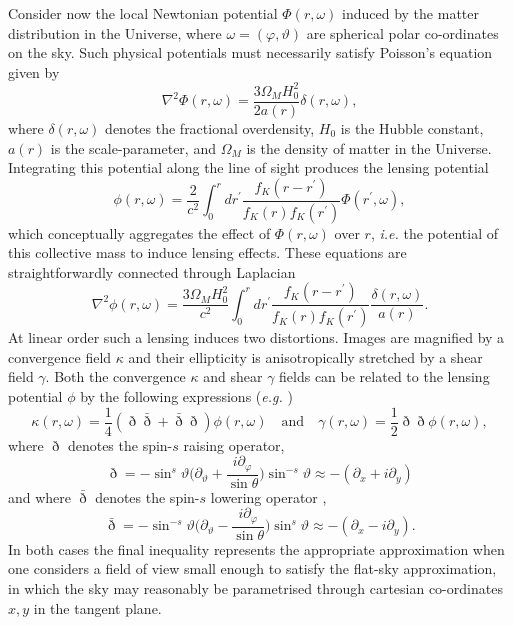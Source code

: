 \documentclass[fleqn,usenatbib]{mnras}
\begin{document}
Consider now the local Newtonian potential $\Phi(r, \omega)$ induced by the matter distribution in the Universe, where $\omega = (\varphi, \vartheta)$ are spherical polar co-ordinates on the sky. Such physical potentials must necessarily satisfy Poisson's equation given by 
\begin{equation}\label{eq:poisson}
	\nabla^2 \Phi(r, \omega) = \dfrac{3\Omega_M H_0^2}{2 a(r)} \delta(r, \omega),
\end{equation}
where $\delta(r,\omega)$ denotes the fractional overdensity, $H_0$ is the Hubble constant, $a(r)$ is the scale-parameter, and $\Omega_M$ is the density of matter in the Universe. Integrating this potential along the line of sight produces the lensing potential 
\begin{equation}\label{eq:lensing_potential}
	\phi(r,\omega) = \dfrac{2}{c^2} \int_{0}^{r}dr^\prime \dfrac{f_K(r - r^\prime)}{f_K(r)f_K(r^\prime)}\Phi(r^\prime,\omega),
\end{equation}
which conceptually aggregates the effect of $\Phi(r,\omega)$ over $r$, \emph{i.e.} the potential of this collective mass to induce lensing effects. These equations are straightforwardly connected through Laplacian 
\begin{equation}
	\nabla^2\phi(r,\omega) = \dfrac{3\Omega_M H_0^2}{c^2} \int_{0}^{r}dr^\prime \dfrac{f_K(r - r^\prime)}{f_K(r)f_K(r^\prime)}\dfrac{\delta(r, \omega)}{a(r)}.
\end{equation}
At linear order such a lensing induces two distortions. Images are magnified by a convergence field $\kappa$ and their ellipticity is anisotropically stretched by a shear field $\gamma$. Both the convergence $\kappa$ and shear $\gamma$ fields can be related to the lensing potential $\phi$ by the following expressions (\textit{e.g.} \citealt{wallis2022mapping})
\begin{equation}
	\kappa(r,\omega) = \frac{1}{4}(\eth\bar{\eth} + \bar{\eth}\eth) \phi(r,\omega)
	\quad \text{and} \quad 
	\gamma(r,\omega) = \frac{1}{2}\eth\eth\phi(r,\omega),
\end{equation}
where $\eth$ denotes the spin-$s$ raising operator,
\begin{equation}
	\eth = -\sin^s\vartheta \big ( \partial_\vartheta + \frac{i\partial_\varphi}{\sin\theta} \big ) \sin^{-s}\vartheta
	\approx -(\partial_x + i\partial_y)
\end{equation}
and where $\bar{\eth}$ denotes the spin-$s$ lowering operator \citep{newman:1966, goldberg:1967},
\begin{equation}
	\bar{\eth} = -\sin^{-s}\vartheta \big ( \partial_\vartheta - \frac{i\partial_\varphi}{\sin\theta} \big ) \sin^{s}\vartheta
	\approx -(\partial_x - i \partial_y).
\end{equation}
In both cases the final inequality represents the appropriate approximation when one considers a field of view small enough to satisfy the flat-sky approximation, in which the sky may reasonably be parametrised through cartesian co-ordinates $x,y$ in the tangent plane. 
\end{document}
